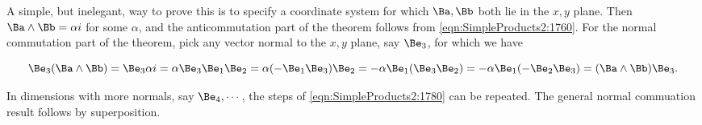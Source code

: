 
A simple, but inelegant, way to prove this is to specify a coordinate system for which \( \Ba, \Bb \) both lie in the \( x,y \) plane.  Then \( \Ba \wedge \Bb = \alpha i \) for some \( \alpha \), and the anticommutation part of the theorem follows from
\cref{eqn:SimpleProducts2:1760}.  For the normal commutation part of the theorem, pick any vector normal to the \(x, y\) plane, say \( \Be_3\), for which we have

\begin{dmath}\label{eqn:SimpleProducts2:1780}
\Be_3  (\Ba \wedge \Bb)
=
\Be_3 \alpha i
=
\alpha \Be_3 \Be_1 \Be_2
=
\alpha (-\Be_1 \Be_3) \Be_2
=
-\alpha \Be_1 (\Be_3 \Be_2)
=
-\alpha \Be_1 (-\Be_2 \Be_3)
= (\Ba \wedge \Bb) \Be_3.
\end{dmath}

In dimensions with more normals, say \( \Be_4, \cdots \), the steps of \cref{eqn:SimpleProducts2:1780} can be repeated.  The general normal commuation result follows by superposition.
